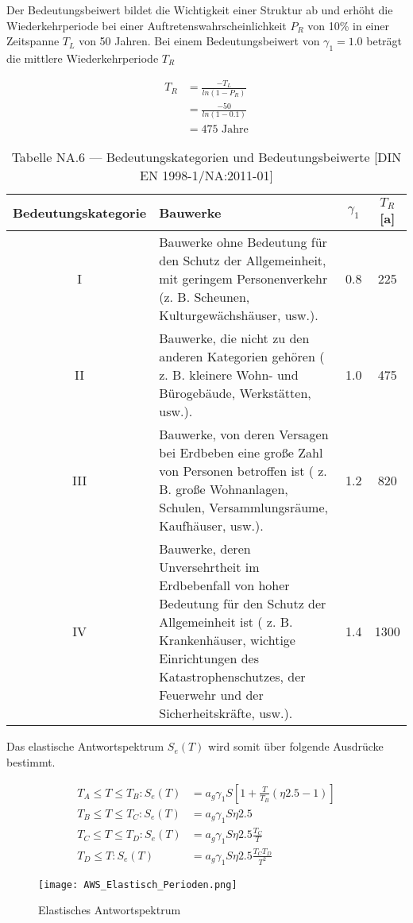 Der Bedeutungsbeiwert bildet die Wichtigkeit einer Struktur ab und erhöht die Wiederkehrperiode bei einer Auftretenswahrscheinlichkeit $P_R$ von 10\% in einer Zeitspanne $T_L$ von 50 Jahren.
Bei einem Bedeutungsbeiwert von $\gamma_1 = 1.0$ beträgt die mittlere Wiederkehrperiode $T_R$

\begin{align*}
T_R &= \frac{-T_L}{ln(1 - P_R)}\\
    &= \frac{-50}{ln(1 - 0.1)}\\
    &=  475 \mbox{ Jahre}
\end{align*}

\begin{table}[H]
\centering
\begin{tabular}{ |c|p{7cm}|c|c| } 
 \hline
 Bedeutungskategorie & Bauwerke & $\gamma_1$ & $T_R$ [a]\\
 \hline\hline
 I   & Bauwerke ohne Bedeutung für den Schutz der Allgemeinheit, mit geringem Personenverkehr (z. B. Scheunen, Kulturgewächshäuser, usw.). & 0.8 & 225\\
 \hline
 II  & Bauwerke, die nicht zu den anderen Kategorien gehören ( z. B. kleinere Wohn- und Bürogebäude, Werkstätten, usw.). & 1.0 & 475\\
 \hline
 III & Bauwerke, von deren Versagen bei Erdbeben eine große Zahl von Personen betroffen ist ( z. B. große Wohnanlagen, Schulen, Versammlungsräume, Kaufhäuser, usw.). & 1.2 & 820\\
 \hline
 IV  & Bauwerke, deren Unversehrtheit im Erdbebenfall von hoher Bedeutung für den Schutz der Allgemeinheit ist ( z. B. Krankenhäuser, wichtige Einrichtungen des Katastrophenschutzes, der Feuerwehr und der Sicherheitskräfte, usw.). & 1.4 & 1300\\
 \hline
\end{tabular}
\caption{Tabelle NA.6 — Bedeutungskategorien und Bedeutungsbeiwerte [DIN EN 1998-1/NA:2011-01]}
\end{table}

Das elastische Antwortspektrum $S_e(T)$ wird somit über folgende Ausdrücke bestimmt.

\begin{align*}
T_A \leq T \leq T_B: S_e(T) &= a_g\gamma_1S \left[ 1+\frac{T}{T_B}(\eta2.5-1) \right] \\
T_B \leq T \leq T_C: S_e(T) &= a_g\gamma_1S\eta2.5\\
T_C \leq T \leq T_D: S_e(T) &= a_g\gamma_1S\eta2.5\frac{T_C}{T}\\
T_D \leq T: S_e(T) &= a_g\gamma_1S\eta2.5\frac{T_CT_D}{T^2}
\end{align*}

\begin{figure}[H]
    \centering
    \texttt{[image: AWS\_Elastisch\_Perioden.png]}
    \caption{Elastisches Antwortspektrum}
\end{figure}

\pagebreak
